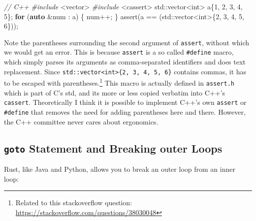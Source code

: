 \documentclass[
]{book}
\newenvironment{Shaded}{\begin{snugshade}}{\end{snugshade}}
\newcommand{\BuiltInTok}[1]{#1}
\newcommand{\CommentTok}[1]{\textcolor[rgb]{0.56,0.35,0.01}{\textit{#1}}}
\newcommand{\ControlFlowTok}[1]{\textcolor[rgb]{0.13,0.29,0.53}{\textbf{#1}}}
\newcommand{\DataTypeTok}[1]{\textcolor[rgb]{0.13,0.29,0.53}{#1}}
\newcommand{\DecValTok}[1]{\textcolor[rgb]{0.00,0.00,0.81}{#1}}
\newcommand{\ImportTok}[1]{#1}
\newcommand{\KeywordTok}[1]{\textcolor[rgb]{0.13,0.29,0.53}{\textbf{#1}}}
\newcommand{\NormalTok}[1]{#1}
\newcommand{\OtherTok}[1]{\textcolor[rgb]{0.56,0.35,0.01}{#1}}
\newcommand{\PreprocessorTok}[1]{\textcolor[rgb]{0.56,0.35,0.01}{\textit{#1}}}
\begin{document}
\begin{Shaded}
\begin{Highlighting}[]
\CommentTok{// C++}
\PreprocessorTok{\#include }\ImportTok{\textless{}vector\textgreater{}}
\PreprocessorTok{\#include }\ImportTok{\textless{}cassert\textgreater{}}
\BuiltInTok{std::}\NormalTok{vector\textless{}}\DataTypeTok{int}\NormalTok{\textgreater{} a\{}\DecValTok{1}\NormalTok{, }\DecValTok{2}\NormalTok{, }\DecValTok{3}\NormalTok{, }\DecValTok{4}\NormalTok{, }\DecValTok{5}\NormalTok{\};}
\ControlFlowTok{for}\NormalTok{ (}\KeywordTok{auto}\NormalTok{ \&num : a)}
\NormalTok{\{}
\NormalTok{    num++;}
\NormalTok{\}}
\OtherTok{assert}\NormalTok{(a == (}\BuiltInTok{std::}\NormalTok{vector\textless{}}\DataTypeTok{int}\NormalTok{\textgreater{}\{}\DecValTok{2}\NormalTok{, }\DecValTok{3}\NormalTok{, }\DecValTok{4}\NormalTok{, }\DecValTok{5}\NormalTok{, }\DecValTok{6}\NormalTok{\}));}
\end{Highlighting}
\end{Shaded}

Note the parentheses surrounding the second argument of \texttt{assert}, without which we would get an error. This is because \texttt{assert} is a so called \texttt{\#define} macro, which simply parses its arguments as comma-separated identifiers and does text replacement. Since \texttt{std::vector\textless{}int\textgreater{}\{2,\ 3,\ 4,\ 5,\ 6\}} contains commas, it has to be escaped with parentheses.\footnote{Related to this stackoverflow question: \url{https://stackoverflow.com/questions/38030048}} This macro is actually defined in \texttt{assert.h} which is part of C's std, and its more or less copied verbatim into C++'s \texttt{cassert}. Theoretically I think it is possible to implement C++'s own \texttt{assert} or \texttt{\#define} that removes the need for adding parentheses here and there. However, the C++ committee never cares about ergonomics.

\hypertarget{goto-statement-and-breaking-outer-loops}{%
\subsection{\texorpdfstring{\texttt{goto} Statement and Breaking outer Loops}{goto Statement and Breaking outer Loops}}\label{goto-statement-and-breaking-outer-loops}}

Rust, like Java and Python, allows you to break an outer loop from an inner loop:
\end{document}
